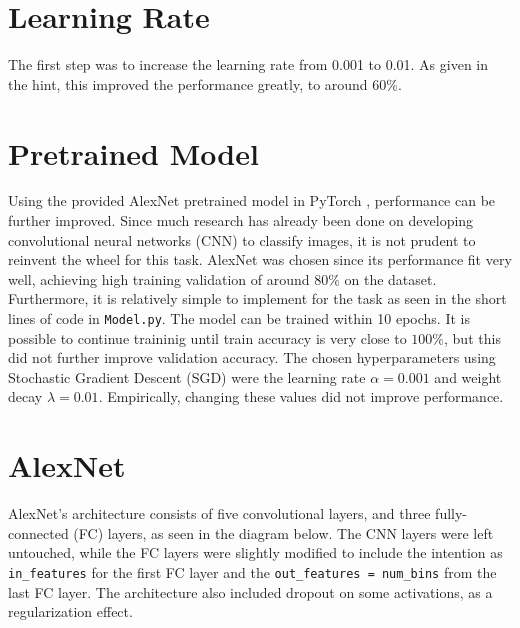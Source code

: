 

\graphicspath{ {../images/} }


    

\section{Learning Rate}

The first step was to increase the learning rate from 0.001 to 0.01.
As given in the hint, this improved the performance greatly, 
to around $60\%$.

\section{Pretrained Model}

Using the provided AlexNet \cite{alex12} pretrained model 
in PyTorch \cite{torch},
performance can be further improved.
Since much research has already been done on developing 
convolutional neural networks (CNN) to classify images,
it is not prudent to reinvent the wheel for this task.
AlexNet was chosen since its performance fit very well,
achieving high training validation of around $80\%$ on the dataset.
Furthermore, it is relatively simple to implement for the task
as seen in the short lines of code in \texttt{Model.py}.
The model can be trained within 10 epochs.
It is possible to continue traininig until 
train accuracy is very close to $100\%$,
but this did not further improve validation accuracy.
The chosen hyperparameters using Stochastic Gradient Descent (SGD)
were the learning rate $\alpha=0.001$ and 
weight decay $\lambda=0.01$.
Empirically, changing these values did not improve performance.

\newpage
\section{AlexNet}

AlexNet's architecture consists of five convolutional layers,
and three fully-connected (FC) layers, as seen in the diagram below.
The CNN layers were left untouched, while the FC layers were
slightly modified to include the intention as \texttt{in\_features}
for the first FC layer
and the \texttt{out\_features = num\_bins} from the last FC layer.
The architecture also included dropout on some activations,
as a regularization effect.

